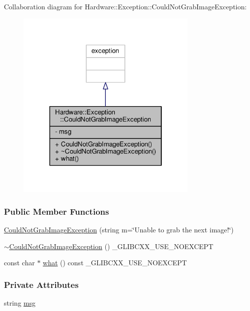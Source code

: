 Collaboration diagram for Hardware\+:\+:Exception\+:\+:Could\+Not\+Grab\+Image\+Exception\+:
\nopagebreak
\begin{figure}[H]
\begin{center}
\leavevmode
\includegraphics[width=250pt]{class_hardware_1_1_exception_1_1_could_not_grab_image_exception__coll__graph}
\end{center}
\end{figure}
\subsubsection*{Public Member Functions}
\begin{DoxyCompactItemize}
\item 
\hyperlink{class_hardware_1_1_exception_1_1_could_not_grab_image_exception_a8bddfebe4a59346dbddae7f8bf85af8a}{Could\+Not\+Grab\+Image\+Exception} (string m=\char`\"{}Unable to grab the next image!\char`\"{})
\item 
\hyperlink{class_hardware_1_1_exception_1_1_could_not_grab_image_exception_a8f476ae2d11458f632ba2ecfd9016cb3}{$\sim$\+Could\+Not\+Grab\+Image\+Exception} () \+\_\+\+G\+L\+I\+B\+C\+X\+X\+\_\+\+U\+S\+E\+\_\+\+N\+O\+E\+X\+C\+E\+P\+T
\item 
const char $\ast$ \hyperlink{class_hardware_1_1_exception_1_1_could_not_grab_image_exception_a1d4483097dc5dc87a90380988999b9fd}{what} () const \+\_\+\+G\+L\+I\+B\+C\+X\+X\+\_\+\+U\+S\+E\+\_\+\+N\+O\+E\+X\+C\+E\+P\+T
\end{DoxyCompactItemize}
\subsubsection*{Private Attributes}
\begin{DoxyCompactItemize}
\item 
string \hyperlink{class_hardware_1_1_exception_1_1_could_not_grab_image_exception_a3fe61759aec4ce332a968f49ced6b12a}{msg}
\end{DoxyCompactItemize}


